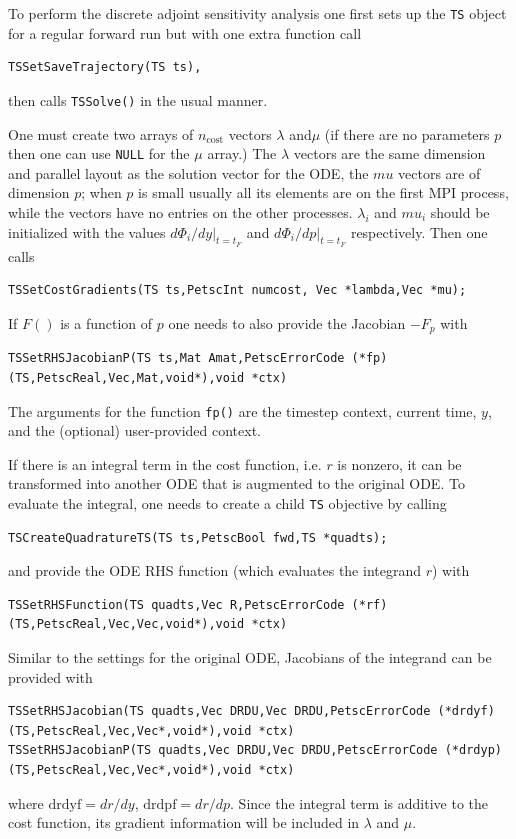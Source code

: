 To perform the discrete adjoint sensitivity analysis one first sets up the \lstinline{TS} object for a regular forward run but with one extra function call
\begin{lstlisting}
TSSetSaveTrajectory(TS ts),
\end{lstlisting}
then calls \lstinline{TSSolve()} in the usual manner.

One must create two arrays of $n_\text{cost}$ vectors $\lambda$ and$\mu$ (if there are no parameters $p$ then one can use \lstinline{NULL} for the $\mu$ array.) The $\lambda$ vectors are the same dimension and parallel layout as the solution vector for the ODE, the $mu$ vectors are of dimension $p$; when $p$ is small usually all its elements are on the first MPI process, while the vectors have no entries on the other processes. $\lambda_i$ and $mu_i$ should be initialized with the values $d\Phi_i/dy|_{t=t_F}$ and $d\Phi_i/dp|_{t=t_F}$ respectively. Then one calls
\begin{lstlisting}
TSSetCostGradients(TS ts,PetscInt numcost, Vec *lambda,Vec *mu);
\end{lstlisting}

If $F()$ is a function of $p$ one needs to also provide the Jacobian $-F_p$ with
\begin{lstlisting}
TSSetRHSJacobianP(TS ts,Mat Amat,PetscErrorCode (*fp)(TS,PetscReal,Vec,Mat,void*),void *ctx)
\end{lstlisting}
The arguments for the function \lstinline{fp()}
are the timestep context, current time, $y$, and the (optional) user-provided context.

If there is an integral term in the cost function, i.e. $r$ is nonzero, it can be transformed into another ODE that is augmented to the original ODE. To evaluate the integral, one needs to create a child \lstinline{TS} objective by calling
\begin{lstlisting}
TSCreateQuadratureTS(TS ts,PetscBool fwd,TS *quadts);
\end{lstlisting}
and provide the ODE RHS function (which evaluates the integrand $r$) with
\begin{lstlisting}
TSSetRHSFunction(TS quadts,Vec R,PetscErrorCode (*rf)(TS,PetscReal,Vec,Vec,void*),void *ctx)
\end{lstlisting}

Similar to the settings for the original ODE, Jacobians of the integrand can be provided with
\begin{lstlisting}
TSSetRHSJacobian(TS quadts,Vec DRDU,Vec DRDU,PetscErrorCode (*drdyf)(TS,PetscReal,Vec,Vec*,void*),void *ctx)
TSSetRHSJacobianP(TS quadts,Vec DRDU,Vec DRDU,PetscErrorCode (*drdyp)(TS,PetscReal,Vec,Vec*,void*),void *ctx)
\end{lstlisting}
where $\mathrm{drdyf}= dr /dy$, $\mathrm{drdpf} = dr /dp$. Since the integral term is additive to the cost function, its gradient information will be included in $\lambda$ and $\mu$.

